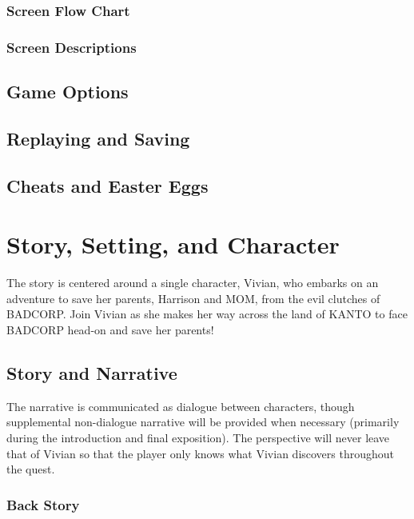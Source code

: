 \documentclass[12pt,titlepage]{article}
\newcommand{\protagonist}{Vivian\xspace}
\newcommand{\dad}{Harrison\xspace}
\newcommand{\mom}{MOM\xspace}
\newcommand{\evilCorp}{BADCORP\xspace}
\newcommand{\world}{KANTO\xspace}
\begin{document}
\subsubsection{Screen Flow Chart}

\subsubsection{Screen Descriptions}
%

\subsection{Game Options}

\subsection{Replaying and Saving}

\subsection{Cheats and Easter Eggs}

\newpage
\section{Story, Setting, and Character}

The story is centered around a single character, \protagonist, who embarks on an
adventure to save her parents, \dad and \mom, from the evil clutches of
\evilCorp. Join \protagonist as she makes her way across the land of \world to
face \evilCorp head-on and save her parents!

\subsection{Story and Narrative}

The narrative is communicated as dialogue between characters, though
supplemental non-dialogue narrative will be provided when necessary (primarily
during the introduction and final exposition). The perspective will never leave
that of \protagonist so that the player only knows what \protagonist discovers
throughout the quest.

\subsubsection{Back Story}
\end{document}

